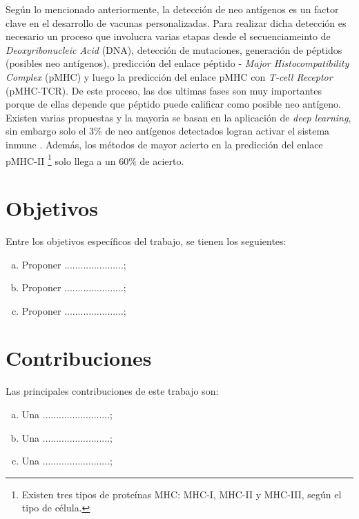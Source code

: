 Según lo mencionado anteriormente, la detección de neo antígenos es un factor clave en el desarrollo de vacunas personalizadas. Para realizar dicha detección es necesario un proceso que involucra varias etapas desde el secuenciameinto de \textit{Deoxyribonucleic Acid} (DNA), detección de mutaciones, generación de péptidos (posibles neo antígenos), predicción del enlace péptido - \textit{Major Histocompatibility Complex} (pMHC) y luego la predicción del enlace pMHC con \textit{T-cell Receptor} (pMHC-TCR). De este proceso, las dos ultimas fases son muy importantes porque de ellas depende que péptido puede calificar como posible neo antígeno. Existen varias propuestas y la mayoria se basan en la aplicación de \textit{deep learning}, sin embargo solo el 3\% de neo antígenos detectados logran activar el sistema inmune \citep{de2020neoantigen}. Además, los métodos de mayor acierto en la predicción del enlace pMHC-II \footnote{Existen tres tipos de proteínas MHC: MHC-I, MHC-II y MHC-III, según el tipo de célula.} solo llega a un 60\% de acierto.



\section{Objetivos}
\label{sec:objetivos}


Entre los objetivos específicos del trabajo, se tienen los seguientes:

\begin{enumerate}[(a)]
\item Proponer  ......................;
\item Proponer  ......................;
\item Proponer  ......................;
\end{enumerate}

\section{Contribuciones}
\label{sec:contribuciones}
Las principales contribuciones de este trabajo son:

\begin{enumerate}[(a)]
	\item Una .........................;
	\item Una .........................;
	\item Una .........................;
	
\end{enumerate}

